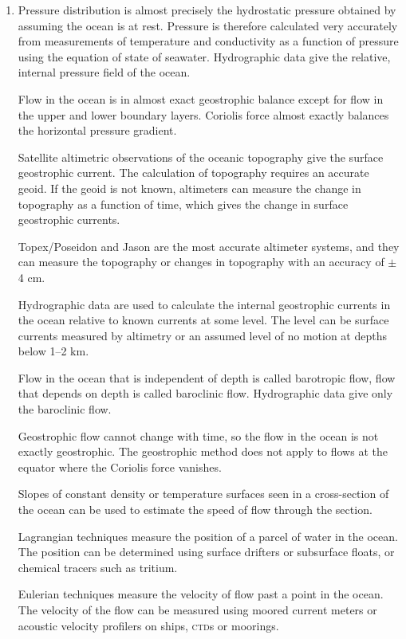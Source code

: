 \begin{enumerate}

\item Pressure distribution is almost precisely the hydrostatic pressure
obtained by assuming the ocean is at rest. Pressure is therefore
calculated very accurately from measurements of temperature and
conductivity as a function of pressure using the equation of state of
seawater. Hydrographic data
give the relative, internal pressure field of the ocean.

\vitem Flow in the ocean is in almost exact geostrophic
balance except for flow in the upper and
lower boundary layers. Coriolis force almost exactly balances the
horizontal pressure gradient.

\vitem Satellite altimetric observations of the oceanic topography
give the surface geostrophic current. The calculation of topography
requires an accurate geoid. If the geoid is
not known, altimeters can measure the change in topography as a
function of time, which gives the change in surface geostrophic
currents.

\vitem Topex/Poseidon and Jason are
the most accurate altimeter systems, and they can measure the
topography or changes in
topography with an accuracy of $\pm$4 cm.

\vitem Hydrographic data are used to calculate the internal geostrophic
currents in
the ocean relative to known currents at some level. The level can be
surface currents measured by altimetry or an assumed level of no
motion at depths below 1--2 km.

\vitem Flow in the ocean that is independent of depth is called
barotropic flow, flow that depends on depth is called baroclinic
flow. Hydrographic data give only the baroclinic flow.

\vitem Geostrophic flow cannot change with time, so the flow in the
ocean is not exactly geostrophic. The geostrophic method does not
apply to flows at the equator where the Coriolis force vanishes.

\vitem Slopes of constant density or temperature surfaces seen in a
cross-section of the ocean can be used to estimate the speed of flow
through the section.

\vitem Lagrangian techniques measure the position of a parcel of water
in the ocean. The position can be determined using surface drifters or
subsurface floats, or chemical tracers such as
tritium.

\vitem Eulerian techniques measure the velocity of flow past a point
in the ocean.  The velocity of the flow can be measured using moored
current meters or acoustic velocity profilers on ships,
\textsc{ctd}s or moorings.
\end{enumerate}


